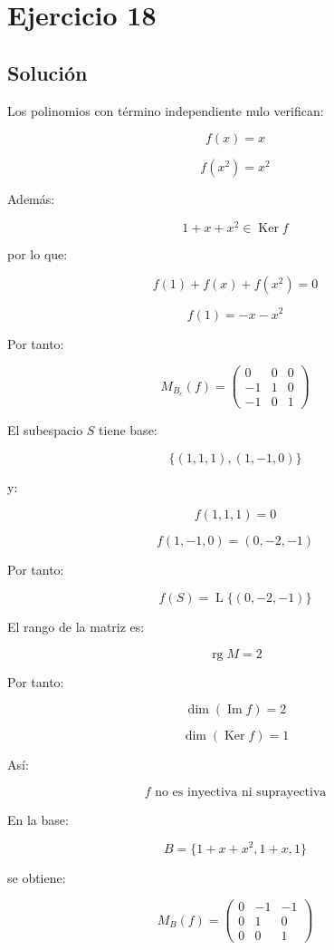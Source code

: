 \documentclass[11pt,a4paper]{article}
\newcommand{\Ker}{\operatorname{Ker}}
\newcommand{\Ima}{\operatorname{Im}}
\newcommand{\rg}{\operatorname{rg}}
\newcommand{\Span}{\operatorname{L}}
\begin{document}
\section{Ejercicio 18}
	\subsection{Solución}

	Los polinomios con término independiente nulo verifican:

	\[
	f(x)=x
	\]

	\[
	f(x^2)=x^2
	\]

	Además:

	\[
	1+x+x^2\in\Ker f
	\]

	por lo que:

	\[
	f(1)+f(x)+f(x^2)=0
	\]

	\[
	f(1)=-x-x^2
	\]

	Por tanto:

	\[
	\boxed{
	M_{B_c}(f)
	=
	\begin{pmatrix}
	0&0&0\\
	-1&1&0\\
	-1&0&1
	\end{pmatrix}
	}
	\]

	El subespacio $S$ tiene base:

	\[
	\{(1,1,1),(1,-1,0)\}
	\]

	y:

	\[
	f(1,1,1)=0
	\]

	\[
	f(1,-1,0)=(0,-2,-1)
	\]

	Por tanto:

	\[
	\boxed{
	f(S)
	=
	\Span\{(0,-2,-1)\}
	}
	\]

	El rango de la matriz es:

	\[
	\rg M=2
	\]

	Por tanto:

	\[
	\dim(\Ima f)=2
	\]

	\[
	\dim(\Ker f)=1
	\]

	Así:

	\[
	\boxed{
	f\text{ no es inyectiva ni suprayectiva}
	}
	\]

	En la base:

	\[
	B=\{1+x+x^2,1+x,1\}
	\]

	se obtiene:

	\[
	M_B(f)
	=
	\begin{pmatrix}
	0&-1&-1\\
	0&1&0\\
	0&0&1
	\end{pmatrix}
	\]
\end{document}
